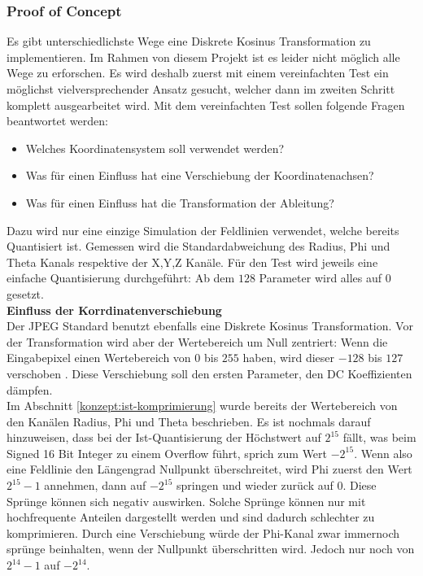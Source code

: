 \subsubsection{Proof of Concept}
Es gibt unterschiedlichste Wege eine Diskrete Kosinus Transformation zu implementieren. Im Rahmen von diesem Projekt ist es leider nicht möglich alle Wege zu erforschen. Es wird deshalb zuerst mit einem vereinfachten Test ein möglichst vielversprechender Ansatz gesucht, welcher dann im zweiten Schritt komplett ausgearbeitet wird. Mit dem vereinfachten Test sollen folgende Fragen beantwortet werden:
\begin{itemize}
	\item Welches Koordinatensystem soll verwendet werden?
	\item Was für einen Einfluss hat eine Verschiebung der Koordinatenachsen?
	\item Was für einen Einfluss hat die Transformation der Ableitung?
\end{itemize}
Dazu wird nur eine einzige Simulation der Feldlinien verwendet, welche bereits Quantisiert ist. Gemessen wird die Standardabweichung des Radius, Phi und Theta Kanals respektive der X,Y,Z Kanäle. Für den Test wird jeweils eine einfache Quantisierung durchgeführt: Ab dem $128$ Parameter wird alles auf $0$ gesetzt.\\
[\baselineskip]
\textbf{Einfluss der Korrdinatenverschiebung}\\
Der JPEG Standard  benutzt ebenfalls eine Diskrete Kosinus Transformation. Vor der Transformation wird aber der Wertebereich um Null zentriert: Wenn die Eingabepixel einen Wertebereich von  $0$ bis $255$ haben, wird dieser $-128$ bis $127$ verschoben \cite{wiki:dct:jpeg}. Diese Verschiebung soll den ersten Parameter, den DC Koeffizienten \cite{wiki:dc_bias} dämpfen.\\
[\baselineskip]
Im Abschnitt \ref{konzept:ist-komprimierung} wurde bereits der Wertebereich von den Kanälen Radius, Phi und Theta beschrieben. Es ist nochmals darauf hinzuweisen, dass bei der Ist-Quantisierung der Höchstwert auf $2^15$ fällt, was beim Signed 16 Bit Integer zu einem Overflow führt, sprich zum Wert $-2^15$. Wenn also eine Feldlinie den Längengrad Nullpunkt überschreitet, wird Phi zuerst den Wert$2^15-1$ annehmen, dann auf $-2^15$ springen und wieder zurück auf 0. Diese Sprünge können sich negativ auswirken. Solche Sprünge können nur mit hochfrequente Anteilen dargestellt werden und sind dadurch schlechter zu komprimieren. Durch eine Verschiebung würde der Phi-Kanal zwar immernoch sprünge beinhalten, wenn der Nullpunkt überschritten wird. Jedoch nur noch von $2^14-1$ auf $-2^14$.
